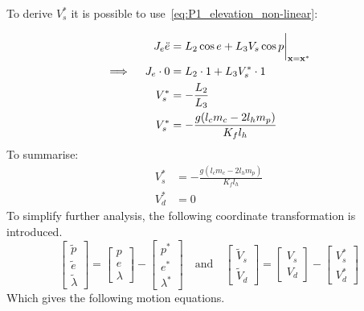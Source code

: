 To derive $V_s^*$ it is possible to use~\cref{eq:P1_elevation_non-linear}:

\begin{align*}
     J_e \ddot{e} &= L_2 \cos{e} + L_3 V_s \cos{p}\bigg{|}_{\mathbf{x}=\mathbf{x^*}} \\
     \implies\quad J_e\cdot0 &= L_2\cdot1 + L_3V_s^*\cdot1 \\
     V_s^* &= -\frac{L_2}{L_3} \\
     V_s^* &= -\frac{g(l_c m_c - 2 l_h m_p)}{K_f l_h}
\end{align*}
To summarise:
\begin{subequations}
    \begin{align}
        V_s^* &= -\frac{g(l_c m_c - 2 l_h m_p)}{K_f l_h} \label{eq:P1p2_Vs_asterix} \\
        V_d^* &= 0 \label{eq:P1p2_Vd_asterix}
    \end{align}    
\end{subequations}
To simplify further analysis, the following coordinate transformation is introduced.
\begin{equation}
    \begin{bmatrix}
        \tilde{p} \\ \tilde{e} \\ \tilde{\lambda}
    \end{bmatrix}
    =
    \begin{bmatrix}
        p \\ e \\ \lambda
    \end{bmatrix}
    -
    \begin{bmatrix}
        p^* \\ e^* \\ \lambda^*
    \end{bmatrix}
    \quad \text{and} \quad
    \begin{bmatrix}
        \tilde{V}_s \\ \tilde{V}_d
    \end{bmatrix}
    =
    \begin{bmatrix}
        V_s \\ V_d
    \end{bmatrix}
    -
    \begin{bmatrix}
        V_s^* \\ V_d^*
    \end{bmatrix}
\end{equation}
Which gives the following motion equations.
